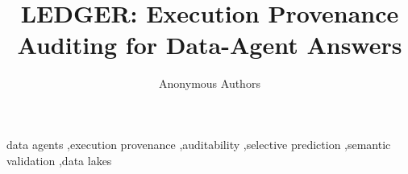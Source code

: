\documentclass[5p,times]{elsarticle}
\begin{document}
\begin{frontmatter}

\title{LEDGER: Execution Provenance Auditing for Data-Agent Answers}

\author{Anonymous Authors}

\begin{abstract}

\end{abstract}

\begin{keyword}
data agents \sep execution provenance \sep auditability \sep selective prediction \sep semantic validation \sep data lakes
\end{keyword}

\end{frontmatter}















\end{document}
